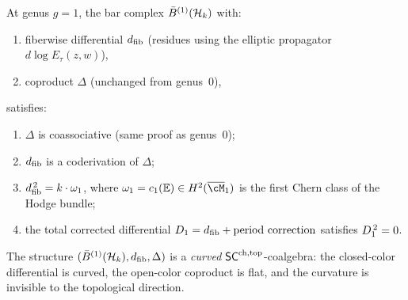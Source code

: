 \begin{theorem}
\label{thm:rosetta-curved}
At genus $g = 1$, the bar complex $\bar{B}^{(1)}(\mathcal{H}_k)$ with:
\begin{enumerate}[label=\textup{(\roman*)}]
\item fiberwise differential $d_{\mathrm{fib}}$ \textup{(}residues using
  the elliptic propagator $d\log E_\tau(z, w)$\textup{)},
\item coproduct $\Delta$ \textup{(}unchanged from genus~$0$\textup{)},
\end{enumerate}
satisfies:
\begin{enumerate}[label=\textup{(\alph*)}]
\item\label{item:rosetta-curved-delta}
  $\Delta$ is coassociative \textup{(}same proof as genus~$0$\textup{)};
\item\label{item:rosetta-curved-coder}
  $d_{\mathrm{fib}}$ is a coderivation of $\Delta$;
\item\label{item:rosetta-curved-dsquared}
  $d_{\mathrm{fib}}^{\,2} = k \cdot \omega_1$, where
  $\omega_1 = c_1(\mathbb{E}) \in H^2(\overline{\cM}_1)$
  is the first Chern class of the Hodge bundle;
\item\label{item:rosetta-curved-corrected}
  the total corrected differential
  $D_{1} = d_{\mathrm{fib}} + \text{\textup{period correction}}$
  satisfies $D_{1}^{\,2} = 0$.
\end{enumerate}
The structure $(\bar{B}^{(1)}(\mathcal{H}_k), d_{\mathrm{fib}}, \Delta)$ is a
\emph{curved} $\mathsf{SC}^{\mathrm{ch,top}}$-coalgebra: the closed-color
differential is curved, the open-color coproduct is flat,
and the curvature is invisible to the topological direction.
\end{theorem}

